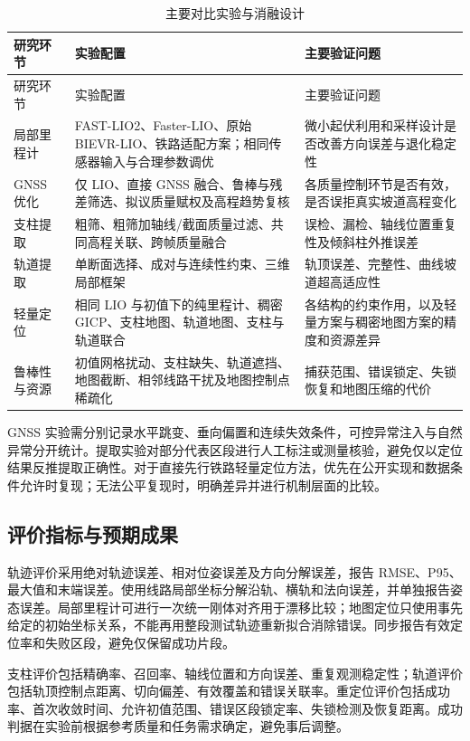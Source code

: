 \documentclass[UTF8,a4paper,12pt,fontset=fandol]{ctexart}
\begin{document}
\begin{longtable}{p{2.5cm}p{5.7cm}p{5.4cm}}
\caption{主要对比实验与消融设计}\label{tab:experiments}\\
\toprule
研究环节 & 实验配置 & 主要验证问题\\
\midrule
\endfirsthead
\toprule
研究环节 & 实验配置 & 主要验证问题\\
\midrule
\endhead
局部里程计 &
FAST-LIO2、Faster-LIO、原始 BIEVR-LIO、铁路适配方案；相同传感器输入与合理参数调优 &
微小起伏利用和采样设计是否改善方向误差与退化稳定性\\
GNSS 优化 &
仅 LIO、直接 GNSS 融合、鲁棒与残差筛选、拟议质量赋权及高程趋势复核 &
各质量控制环节是否有效，是否误拒真实坡道高程变化\\
支柱提取 &
粗筛、粗筛加轴线/截面质量过滤、共同高程关联、跨帧质量融合 &
误检、漏检、轴线位置重复性及倾斜柱外推误差\\
轨道提取 &
单断面选择、成对与连续性约束、三维局部框架 &
轨顶误差、完整性、曲线坡道超高适应性\\
轻量定位 &
相同 LIO 与初值下的纯里程计、稠密 GICP、支柱地图、轨道地图、支柱与轨道联合 &
各结构的约束作用，以及轻量方案与稠密地图方案的精度和资源差异\\
鲁棒性与资源 &
初值网格扰动、支柱缺失、轨道遮挡、地图截断、相邻线路干扰及地图控制点稀疏化 &
捕获范围、错误锁定、失锁恢复和地图压缩的代价\\
\bottomrule
\end{longtable}

GNSS 实验需分别记录水平跳变、垂向偏置和连续失效条件，可控异常注入与自然异常分开统计。提取实验对部分代表区段进行人工标注或测量核验，避免仅以定位结果反推提取正确性。对于直接先行铁路轻量定位方法，优先在公开实现和数据条件允许时复现；无法公平复现时，明确差异并进行机制层面的比较。

\subsection{评价指标与预期成果}

轨迹评价采用绝对轨迹误差、相对位姿误差及方向分解误差，报告 RMSE、P95、最大值和末端误差。使用线路局部坐标分解沿轨、横轨和法向误差，并单独报告姿态误差。局部里程计可进行一次统一刚体对齐用于漂移比较；地图定位只使用事先给定的初始坐标关系，不能再用整段测试轨迹重新拟合消除错误。同步报告有效定位率和失败区段，避免仅保留成功片段。

支柱评价包括精确率、召回率、轴线位置和方向误差、重复观测稳定性；轨道评价包括轨顶控制点距离、切向偏差、有效覆盖和错误关联率。重定位评价包括成功率、首次收敛时间、允许初值范围、错误区段锁定率、失锁检测及恢复距离。成功判据在实验前根据参考质量和任务需求确定，避免事后调整。
\end{document}
